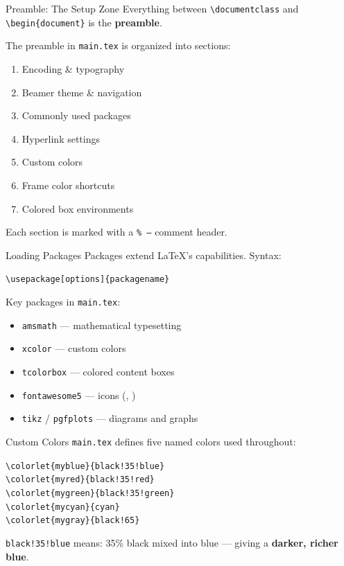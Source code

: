 \blueheader
\begin{frame}{Preamble: The Setup Zone}
Everything between \texttt{\textbackslash documentclass} and \texttt{\textbackslash begin\{document\}} is the \textbf{preamble}.
\medskip
\begin{bluefocus}
  The preamble in \texttt{main.tex} is organized into sections:
  \begin{enumerate}
    \item Encoding \& typography
    \item Beamer theme \& navigation
    \item Commonly used packages
    \item Hyperlink settings
    \item Custom colors
    \item Frame color shortcuts
    \item Colored box environments
  \end{enumerate}
\end{bluefocus}
\medskip
Each section is marked with a \texttt{\% ---} comment header.
\end{frame}

\blueheader
\begin{frame}{Loading Packages}
Packages extend \LaTeX's capabilities. Syntax:
\medskip
\begin{bluefocus}
\texttt{\textbackslash usepackage[options]\{packagename\}}
\end{bluefocus}
\medskip
Key packages in \texttt{main.tex}:
\begin{itemize}
  \item \texttt{amsmath} --- mathematical typesetting
  \item \texttt{xcolor} --- custom colors
  \item \texttt{tcolorbox} --- colored content boxes
  \item \texttt{fontawesome5} --- icons (\faInfoCircle, \faExclamationTriangle)
  \item \texttt{tikz} / \texttt{pgfplots} --- diagrams and graphs
\end{itemize}
\end{frame}

\blueheader
\begin{frame}{Custom Colors}
\texttt{main.tex} defines five named colors used throughout:
\medskip
\begin{bluefocus}
\texttt{\textbackslash colorlet\{myblue\}\{black!35!blue\}}\\
\texttt{\textbackslash colorlet\{myred\}\{black!35!red\}}\\
\texttt{\textbackslash colorlet\{mygreen\}\{black!35!green\}}\\
\texttt{\textbackslash colorlet\{mycyan\}\{cyan\}}\\
\texttt{\textbackslash colorlet\{mygray\}\{black!65\}}
\end{bluefocus}
\medskip
\texttt{black!35!blue} means: 35\% black mixed into blue --- giving a \textcolor{myblue}{\textbf{darker, richer blue}}.
\end{frame}


